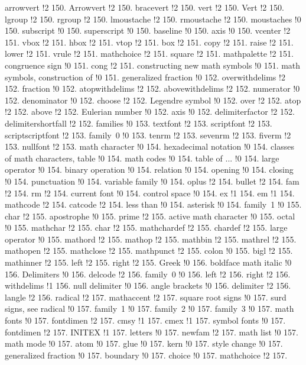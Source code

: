 arrowvert !2 150.
Arrowvert !2 150.
bracevert !2 150.
vert !2 150.
Vert !2 150.
lgroup !2 150.
rgroup !2 150.
lmoustache !2 150.
rmoustache !2 150.
moustaches !0 150.
subscript !0 150.
superscript !0 150.
baseline !0 150.
axis !0 150.
vcenter !2 151.
vbox !2 151.
hbox !2 151.
vtop !2 151.
box !2 151.
copy !2 151.
raise !2 151.
lower !2 151.
vrule !2 151.
mathchoice !2 151.
square !2 151.
mathpalette !2 151.
congruence sign !0 151.
cong !2 151.
constructing new math symbols !0 151.
math symbols, construction of !0 151.
generalized fraction !0 152.
overwithdelims !2 152.
fraction !0 152.
atopwithdelims !2 152.
abovewithdelims !2 152.
numerator !0 152.
denominator !0 152.
choose !2 152.
Legendre symbol !0 152.
over !2 152.
atop !2 152.
above !2 152.
Eulerian number !0 152.
axis !0 152.
delimiterfactor !2 152.
delimitershortfall !2 152.
families !0 153.
textfont !2 153.
scriptfont !2 153.
scriptscriptfont !2 153.
family\penalty \@M \ 0 !0 153.
tenrm !2 153.
sevenrm !2 153.
fiverm !2 153.
nullfont !2 153.
math character !0 154.
hexadecimal notation !0 154.
classes of math characters, table !0 154.
math codes !0 154.
table of ... !0 154.
large operator !0 154.
binary operation !0 154.
relation !0 154.
opening !0 154.
closing !0 154.
punctuation !0 154.
variable family !0 154.
oplus !2 154.
bullet !2 154.
fam !2 154.
rm !2 154.
current font !0 154.
control space !0 154.
ex !1 154.
em !1 154.
mathcode !2 154.
catcode !2 154.
less than !0 154.
asterisk !0 154.
family\penalty \@M \ 1 !0 155.
char !2 155.
apostrophe !0 155.
prime !2 155.
active math character !0 155.
octal !0 155.
mathchar !2 155.
char !2 155.
mathchardef !2 155.
chardef !2 155.
large operator !0 155.
mathord !2 155.
mathop !2 155.
mathbin !2 155.
mathrel !2 155.
mathopen !2 155.
mathclose !2 155.
mathpunct !2 155.
colon !0 155.
bigl !2 155.
mathinner !2 155.
left !2 155.
right !2 155.
Greek !0 156.
boldface math italic !0 156.
Delimiters !0 156.
delcode !2 156.
family\penalty \@M \ 0 !0 156.
left !2 156.
right !2 156.
withdelims !1 156.
null delimiter !0 156.
angle brackets !0 156.
delimiter !2 156.
langle !2 156.
radical !2 157.
mathaccent !2 157.
square root signs !0 157.
surd signs, see radical !0 157.
family\penalty \@M \ 1 !0 157.
family\penalty \@M \ 2 !0 157.
family\penalty \@M \ 3 !0 157.
math fonts !0 157.
fontdimen !2 157.
cmsy !1 157.
cmex !1 157.
symbol fonts !0 157.
fontdimen !2 157.
INITEX !1 157.
letters !0 157.
newfam !2 157.
math list !0 157.
math mode !0 157.
atom !0 157.
glue !0 157.
kern !0 157.
style change !0 157.
generalized fraction !0 157.
boundary !0 157.
choice !0 157.
mathchoice !2 157.
